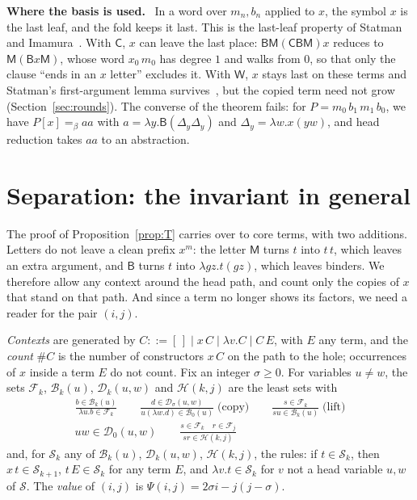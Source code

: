 \documentclass[a4paper,english]{lipics-v2021}
\newcommand{\B}{\mathsf{B}}
\newcommand{\M}{\mathsf{M}}
\newcommand{\Cc}{\mathsf{C}}
\newcommand{\W}{\mathsf{W}}
\newcommand{\eqb}{=_{\beta}}
\newcommand{\Del}[1]{\Delta_{#1}}
\newcommand{\cnt}[1]{\##1}
\newcommand{\Fam}{\mathcal{F}}
\newcommand{\Bod}{\mathcal{B}}
\newcommand{\Hst}{\mathcal{H}}
\newcommand{\runin}[1]{\par\smallskip\noindent\textbf{#1}\ }
\begin{document}
\runin{Where the basis is used.} In a word over $m_n,b_n$ applied to $x$, the symbol $x$ is the last leaf, and the fold keeps it last. This is the last-leaf property of Statman~\cite[Lemma~2]{statman1993} and Imamura~\cite[Lemma~3.2]{imamura1}. With $\Cc$, $x$ can leave the last place: $\B\M(\Cc\B\M)x$ reduces to $\M(\B x\M)$, whose word $x_0\,m_0$ has degree $1$ and walks from $0$, so that only the clause ``ends in an $x$ letter'' excludes it. With $\W$, $x$ stays last on these terms and Statman's first-argument lemma survives~\cite[p.~116]{statman2017}, but the copied term need not grow (Section~\ref{sec:rounds}). The converse of the theorem fails: for $P = m_0\,b_1\,m_1\,b_0$, we have $P[x] \eqb aa$ with $a = \lambda y.\B(\Del{y}\Del{y})$ and $\Del{y} = \lambda w.x(yw)$, and head reduction takes $aa$ to an abstraction.

\section{Separation: the invariant in general}\label{sec:partC}

The proof of Proposition~\ref{prop:T} carries over to core terms, with two additions. Letters do not leave a clean prefix $x^m$: the letter $\M$ turns $t$ into $t\,t$, which leaves an extra argument, and $\B$ turns $t$ into $\lambda gz.t(gz)$, which leaves binders. We therefore allow any context around the head path, and count only the copies of $x$ that stand on that path. And since a term no longer shows its factors, we need a reader for the pair $(i,j)$.

\begin{definition}\label{def:family}
\emph{Contexts} are generated by $C ::= [\,] \mid x\,C \mid \lambda v.C \mid C\,E$, with $E$ any term, and the \emph{count} $\cnt{C}$ is the number of constructors $x\,C$ on the path to the hole; occurrences of $x$ inside a term $E$ do not count. Fix an integer $\sigma \geq 0$. For variables $u \neq w$, the sets $\Fam_k$, $\Bod_k(u)$, $\mathcal{D}_k(u,w)$ and $\Hst(k,j)$ are the least sets with
\begin{gather*}
\frac{b \in \Bod_k(u)}{\lambda u.b \in \Fam_k}\qquad
\frac{d \in \mathcal{D}_\sigma(u,w)}{u(\lambda w.d) \in \Bod_0(u)}\;\text{(copy)}\qquad
\frac{s \in \Fam_k}{su \in \Bod_k(u)}\;\text{(lift)}\\
uw \in \mathcal{D}_0(u,w)\qquad
\frac{s \in \Fam_k \quad r \in \Fam_j}{sr \in \Hst(k,j)}
\end{gather*}
and, for $\mathcal{S}_k$ any of $\Bod_k(u)$, $\mathcal{D}_k(u,w)$, $\Hst(k,j)$, the rules: if $t \in \mathcal{S}_k$, then $x\,t \in \mathcal{S}_{k+1}$, $t\,E \in \mathcal{S}_k$ for any term $E$, and $\lambda v.t \in \mathcal{S}_k$ for $v$ not a head variable $u,w$ of $\mathcal{S}$. The \emph{value} of $(i,j)$ is $\Psi(i,j) = 2\sigma i - j(j-\sigma)$.
\end{definition}
\end{document}
